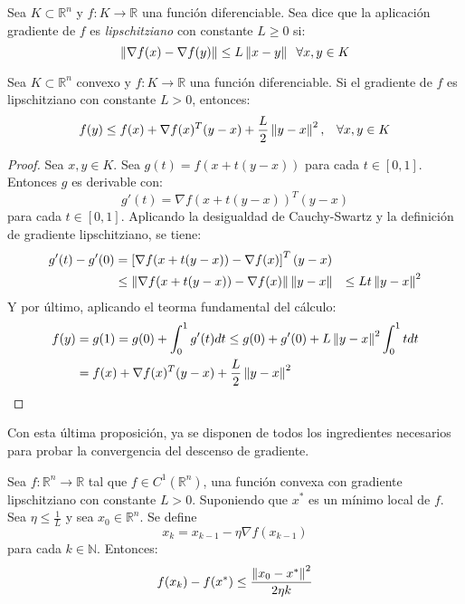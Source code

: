 \begin{definition}
    Sea $K \subset \mathbb{R}^n$ y $f: K \rightarrow \mathbb{R}$ una función diferenciable. Sea dice que la aplicación gradiente de $f$ es \textit{lipschitziano} con constante $L\geq 0$ si:
    \[
        \left\lVert\nabla f(x) - \nabla f(y)\right\rVert \leq L \left\lVert x-y\right\rVert \;\; \forall x,y \in K
    \]
\end{definition}

\begin{proposition}
    Sea $K\subset \mathbb{R}^n$ convexo y $f: K \longrightarrow \mathbb{R}$ una función diferenciable. Si el gradiente de $f$ es lipschitziano con constante $L>0$, entonces:
    \begin{equation}\label{prop:ineq}
        f(y) \leq f(x) + \nabla f(x)^T(y-x) + \frac{L}{2}\left\lVert y-x\right\rVert^2, \;\;\; \forall x,y \in K
    \end{equation}
\end{proposition}

\begin{proof}
    Sea $x,y\in K$. Sea $g(t)=f(x+t(y-x))$ para cada $t\in[0,1]$. Entonces $g$ es derivable con:
    \[
        g'(t) = \nabla f(x+t(y-x))^T(y-x)
    \]
    para cada $t\in [0,1]$. Aplicando la desigualdad de Cauchy-Swartz y la definición de gradiente lipschitziano, se tiene:
    \begin{align*}
        g'(t) - g'(0) & = \left[ \nabla f(x+t(y-x))-\nabla f(x) \right]^T (y-x)\\
         & \leq \left\lVert\nabla f(x+t(y-x))-\nabla f(x)\right\rVert \left\lVert y-x\right\rVert
         & \leq Lt\left\lVert y-x\right\rVert^2
    \end{align*}
    Y por último, aplicando el teorma fundamental del cálculo:
    \begin{align*}
        f(y) & = g(1) = g(0)  + \displaystyle\int_0^1g'(t)dt \leq g(0) + g'(0) + L\left\lVert y-x\right\rVert^2\int_0^1tdt \\
             & = f(x) + \nabla f(x)^T(y-x) + \frac{L}{2}\left\lVert y-x\right\rVert^2
    \end{align*}
\end{proof}

Con esta última proposición, ya se disponen de todos los ingredientes necesarios para probar la convergencia del descenso de gradiente.

\begin{proposition}
    Sea $f: \mathbb{R}^n \longrightarrow \mathbb{R}$ tal que $f\in C^1(\mathbb{R}^n)$, una función convexa con gradiente lipschitziano con constante
    $L>0$. Suponiendo que $x^*$ es un mínimo local de $f$. Sea $\eta \leq \frac{1}{L}$ y sea $x_0\in\mathbb{R}^n$. Se define
    \[
        x_k = x_{k-1} - \eta \nabla f(x_{k-1})
    \]
    para cada $k\in\mathbb{N}$. Entonces:
    \[
        f(x_k)-f(x^*) \leq \frac{\left\lVert x_0-x^*\right\rVert^2}{2\eta k}
    \]
\end{proposition}

